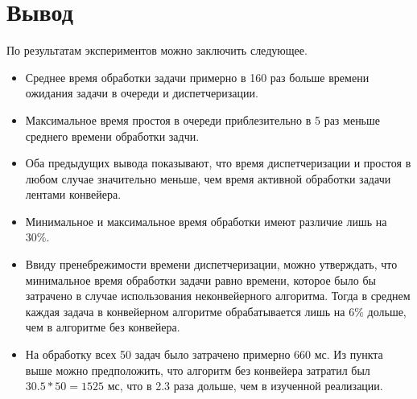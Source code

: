\section*{Вывод}
По результатам экспериментов можно заключить следующее.
\begin{itemize}
	\item Среднее время обработки задачи примерно в 160 раз больше времени ожидания задачи в очереди и диспетчеризации.
	\item Максимальное время простоя в очереди приблезительно в 5 раз меньше среднего времени обработки задчи. 
	\item Оба предыдущих вывода показывают, что время диспетчеризации и простоя в любом случае значительно меньше, чем время активной обработки задачи лентами конвейера.
	\item Минимальное и максимальное время обработки имеют различие лишь на 30\%.
	\item Ввиду пренебрежимости времени диспетчеризации, можно утверждать, что минимальное время обработки задачи равно времени, которое было бы затрачено в случае использования неконвейерного алгоритма. Тогда в среднем каждая задача в конвейерном алгоритме обрабатывается лишь на $6\%$ дольше, чем в алгоритме без конвейера.
	\item На обработку всех 50 задач было затрачено примерно 660 мс. Из пункта выше можно предположить, что алгоритм без конвейера затратил был $30.5*50 = 1525$ мс, что в 2.3 раза дольше, чем в изученной реализации.
\end{itemize}


	
